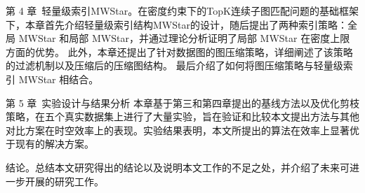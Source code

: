 第 4 章\ 轻量级索引MWStar。在密度约束下的TopK连续子图匹配问题的基础框架下，本章首先介绍轻量级索引结构MWStar的设计，随后提出了两种索引策略：全局 MWStar 和局部 MWStar，并通过理论分析证明了局部 MWStar 在密度上限方面的优势。
此外，本章还提出了针对数据图的图压缩策略，详细阐述了该策略的过滤机制以及压缩后的压缩图结构。
最后介绍了如何将图压缩策略与轻量级索引 MWStar 相结合。

第 5 章\ 实验设计与结果分析
本章基于第三和第四章提出的基线方法以及优化剪枝策略，在五个真实数据集上进行了大量实验，旨在验证和比较本文提出方法与其他对比方案在时空效率上的表现。实验结果表明，本文所提出的算法在效率上显著优于现有的解决方案。

结论。总结本文研究得出的结论以及说明本文工作的不足之处，并介绍了未来可进一步开展的研究工作。
